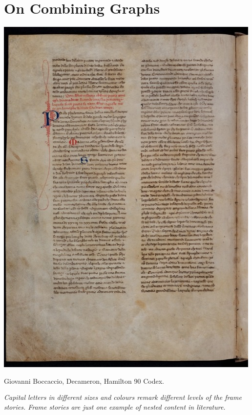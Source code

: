 \part{On Combining Graphs}
\begin{center}
\includegraphics[scale=.6]{fig/divertissments/Decamerone.jpg}
\end{center}

\begin{center}
	Giovanni Boccaccio, Decameron, Hamilton 90 Codex. \\
	\medskip
	
	\textit{Capital letters in different sizes and colours remark different levels of the frame stories. Frame stories are just one example of nested content in literature.}
\end{center}

